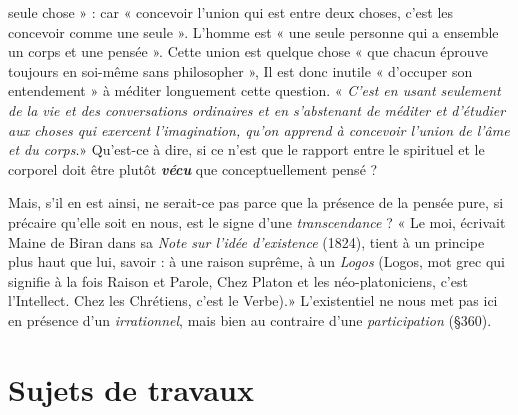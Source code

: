 seule chose » : car « concevoir l’union qui est entre deux choses, c’est
les concevoir comme une seule ». L'homme est « une seule personne
qui a ensemble un corps et une pensée ». Cette union est quelque chose
« que chacun éprouve toujours en soi-même sans philosopher », Il est
donc inutile « d'occuper son entendement » à méditer longuement
cette question. « {\it C’est en usant seulement de la vie et des conversations
ordinaires et en s’abstenant de méditer et d'étudier aux choses qui
exercent l'imagination, qu’on apprend à concevoir l'union de l'âme et
du corps}.» Qu'est-ce à dire, si ce n’est que le rapport entre le spirituel
et le corporel doit être plutôt \textbf{\textit {vécu}} que conceptuellement pensé ?

Mais, s’il en est ainsi, ne serait-ce pas parce que la présence de la
pensée pure, si précaire qu’elle soit en nous, est le signe d’une {\it transcendance} ?
« Le moi, écrivait Maine de Biran dans sa {\it Note sur l’idée
d'existence} (1824), tient à un principe plus haut que lui, savoir : à une
raison suprême, à un {\it Logos}
{\scriptsize (Logos, mot grec qui signifie à la fois Raison et Parole, Chez Platon et les néo-platoniciens, c'est l'Intellect. Chez les Chrétiens, c'est le Verbe)}.» L’existentiel ne nous met pas ici en
présence d’un {\it irrationnel}, mais bien au contraire d’une {\it participation}
(\S 360).

\section{Sujets de travaux}%


